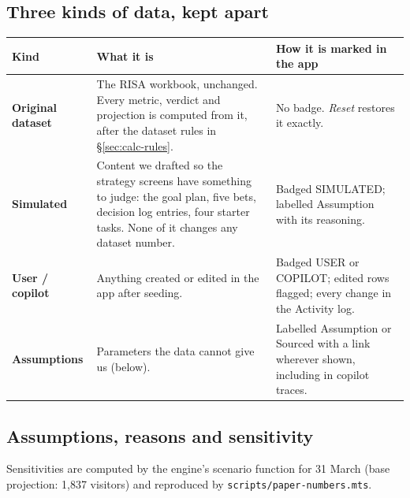 \documentclass[11pt,a4paper]{article}
\newcommand{\code}[1]{\texttt{#1}}
\newcommand{\lbl}[1]{\textsf{\small #1}}
\begin{document}
\subsection{Three kinds of data, kept apart}
\begin{tabularx}{\linewidth}{@{}p{2.8cm}LL@{}}
\toprule
\textbf{Kind} & \textbf{What it is} & \textbf{How it is marked in the app} \\
\midrule
\textbf{Original dataset} & The RISA workbook, unchanged. Every metric, verdict and projection is computed from it, after the dataset rules in \S\ref{sec:calc-rules}. & No badge. \emph{Reset} restores it exactly. \\
\textbf{Simulated} & Content we drafted so the strategy screens have something to judge: the goal plan, five bets, decision log entries, four starter tasks. None of it changes any dataset number. & Badged \lbl{SIMULATED}; labelled \lbl{Assumption} with its reasoning. \\
\textbf{User / copilot} & Anything created or edited in the app after seeding. & Badged \lbl{USER} or \lbl{COPILOT}; edited rows flagged; every change in the Activity log. \\
\textbf{Assumptions} & Parameters the data cannot give us (below). & Labelled \lbl{Assumption} or \lbl{Sourced} with a link wherever shown, including in copilot traces. \\
\bottomrule
\end{tabularx}

\subsection{Assumptions, reasons and sensitivity}
Sensitivities are computed by the engine's scenario function for 31 March (base projection: 1,837 visitors) and reproduced by \code{scripts/paper-numbers.mts}.
\end{document}
